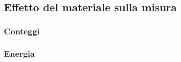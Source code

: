 \documentclass[a4paper]{article}
\begin{document}
\subsection{Effetto del materiale sulla misura}

\subsubsection{Conteggi}


\subsubsection{Energia}
\end{document}
